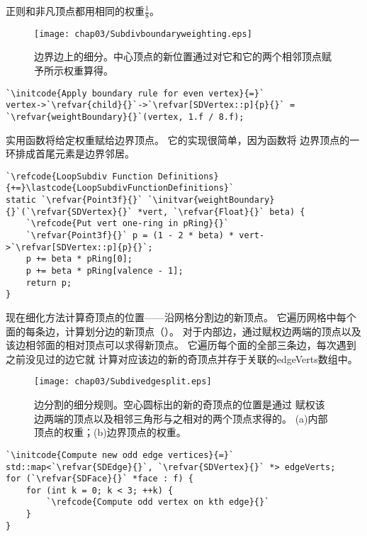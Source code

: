 正则和非凡顶点都用相同的权重$\displaystyle\frac{1}{8}$。
\begin{figure}[htbp]
    \centering\texttt{[image: chap03/Subdivboundaryweighting.eps]}
    \caption{边界边上的细分。中心顶点的新位置通过对它和它的两个相邻顶点赋予所示权重算得。}
    \label{fig:3.34}
\end{figure}

\begin{lstlisting}
`\initcode{Apply boundary rule for even vertex}{=}`
vertex->`\refvar{child}{}`->`\refvar[SDVertex::p]{p}{}` = `\refvar{weightBoundary}{}`(vertex, 1.f / 8.f);
\end{lstlisting}

实用函数将给定权重赋给边界顶点。
它的实现很简单，因为函数将
边界顶点的一环排成首尾元素是边界邻居。
\begin{lstlisting}
`\refcode{LoopSubdiv Function Definitions}{+=}\lastcode{LoopSubdivFunctionDefinitions}`
static `\refvar{Point3f}{}` `\initvar{weightBoundary}{}`(`\refvar{SDVertex}{}` *vert, `\refvar{Float}{}` beta) {
    `\refcode{Put vert one-ring in pRing}{}`
    `\refvar{Point3f}{}` p = (1 - 2 * beta) * vert->`\refvar[SDVertex::p]{p}{}`;
    p += beta * pRing[0];
    p += beta * pRing[valence - 1];
    return p;
}
\end{lstlisting}

现在细化方法计算奇顶点的位置——沿网格分割边的新顶点。
它遍历网格中每个面的每条边，计算划分边的新顶点（）。
对于内部边，通过赋权边两端的顶点以及
该边相邻面的相对顶点可以求得新顶点。
它遍历每个面的全部三条边，每次遇到之前没见过的边它就
计算对应该边的新的奇顶点并存于关联的{\ttfamily edgeVerts}数组中。
\begin{figure}[htbp]
    \centering\texttt{[image: chap03/Subdivedgesplit.eps]}
    \caption{边分割的细分规则。空心圆标出的新的奇顶点的位置是通过
        赋权该边两端的顶点以及相邻三角形与之相对的两个顶点求得的。
        (a)内部顶点的权重；(b)边界顶点的权重。}
    \label{fig:3.35}
\end{figure}

\begin{lstlisting}
`\initcode{Compute new odd edge vertices}{=}`
std::map<`\refvar{SDEdge}{}`, `\refvar{SDVertex}{}` *> edgeVerts;
for (`\refvar{SDFace}{}` *face : f) {
    for (int k = 0; k < 3; ++k) {
        `\refcode{Compute odd vertex on kth edge}{}`
    }
}
\end{lstlisting}

